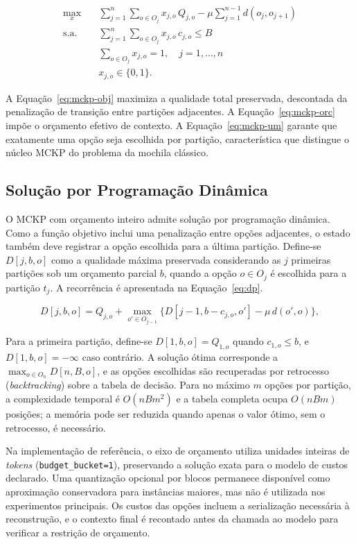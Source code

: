 \begin{align}
\max_{x} \quad & \sum_{j=1}^{n} \sum_{o \in O_j} x_{j,o} \, Q_{j,o}
    - \mu \sum_{j=1}^{n-1} d(o_j, o_{j+1}) \label{eq:mckp-obj} \\
\text{s.a.} \quad & \sum_{j=1}^{n} \sum_{o \in O_j} x_{j,o} \, c_{j,o} \leq B \label{eq:mckp-orc} \\
& \sum_{o \in O_j} x_{j,o} = 1, \quad j = 1, \ldots, n \label{eq:mckp-um} \\
& x_{j,o} \in \{0,1\}. \label{eq:mckp-bin}
\end{align}

A Equação~\ref{eq:mckp-obj} maximiza a qualidade total preservada, descontada da penalização de transição entre partições adjacentes. A Equação~\ref{eq:mckp-orc} impõe o orçamento efetivo de contexto. A Equação~\ref{eq:mckp-um} garante que exatamente uma opção seja escolhida por partição, característica que distingue o núcleo MCKP do problema da mochila clássico.

\subsection{Solução por Programação Dinâmica}
\label{subsec:dp}

O MCKP com orçamento inteiro admite solução por programação dinâmica. Como a função objetivo inclui uma penalização entre opções adjacentes, o estado também deve registrar a opção escolhida para a última partição. Define-se $D[j,b,o]$ como a qualidade máxima preservada considerando as $j$ primeiras partições sob um orçamento parcial $b$, quando a opção $o\in O_j$ é escolhida para a partição $t_j$. A recorrência é apresentada na Equação~\ref{eq:dp}.

\begin{equation}
\label{eq:dp}
D[j,b,o] = Q_{j,o} + \max_{o' \in O_{j-1}}
\Big\{D[j-1,b-c_{j,o},o'] - \mu\,d(o',o)\Big\},
\end{equation}

Para a primeira partição, define-se $D[1,b,o]=Q_{1,o}$ quando $c_{1,o}\leq b$, e $D[1,b,o]=-\infty$ caso contrário. A solução ótima corresponde a $\max_{o\in O_n}D[n,B,o]$, e as opções escolhidas são recuperadas por retrocesso (\textit{backtracking}) sobre a tabela de decisão. Para no máximo $m$ opções por partição, a complexidade temporal é $O(nBm^2)$ e a tabela completa ocupa $O(nBm)$ posições; a memória pode ser reduzida quando apenas o valor ótimo, sem o retrocesso, é necessário.

Na implementação de referência, o eixo de orçamento utiliza unidades inteiras de \textit{tokens} (\texttt{budget\_bucket=1}), preservando a solução exata para o modelo de custos declarado. Uma quantização opcional por blocos permanece disponível como aproximação conservadora para instâncias maiores, mas não é utilizada nos experimentos principais. Os custos das opções incluem a serialização necessária à reconstrução, e o contexto final é recontado antes da chamada ao modelo para verificar a restrição de orçamento.


